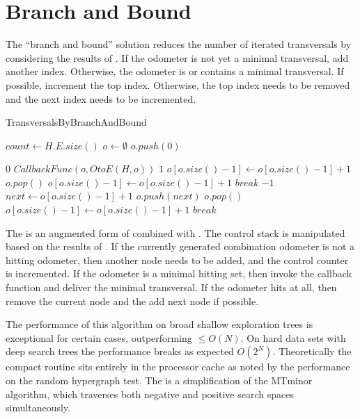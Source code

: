 \chapter{Branch and Bound}

The ``branch and bound'' solution reduces the number of iterated transversals by considering the results of . If the odometer is not yet a minimal transversal, add another index. Otherwise, the odometer is or contains a minimal transversal. If possible,  increment the top index. Otherwise, the top index needs to be removed and the next index needs to be incremented.

\begin{algorithm}[H]
    \centering
	\caption{TransversalsByBranchAndBound}\label{TransversalsByBranchAndBound}
	\begin{algorithmic}[1]
		\State $count \gets H.E.size()$
		\State $o \gets \emptyset$
		\State $o.push(0)$
		 {}
		
		\Case $0$
		\State $CallbackFunc(o,OtoE(H,o))$  
		\EndCase
		\Case $1$
		\State $o[o.size()-1] \gets o[o.size()-1] +1$
		\Else
		\State $o.pop()$
		\State $o[o.size()-1] \gets o[o.size()-1] +1 $
		\EndIf
		\EndIf
		\State $break$
		\EndCase
		\Case $-1$
		\State $next \gets o[o.size()-1] + 1$
		\State $o.push(next)$
		\Else
		\State $o.pop()$
		\State $o[o.size()-1] \gets o[o.size()-1] +1 $
		\EndIf
		\EndIf
		\State $break$
		\EndCase
		\EndSwitch
		
		\EndWhile
		\EndFunction
	\end{algorithmic}
\end{algorithm}

The  is an augmented form of  combined with . The control stack is manipulated based on the results of . If the currently generated combination odometer is not a hitting odometer, then another node needs to be added, and the control counter is incremented. 
If the odometer is a minimal hitting set, then invoke the callback function and deliver the minimal transversal. If the odometer hits at all, then remove the current node and the add next node if possible. 

The performance of this algorithm on broad shallow exploration trees is exceptional for certain cases, outperforming $ \le O(N)$. On hard data sets with deep search trees the performance breaks as expected $O(2^N)$. Theoretically the compact routine sits entirely in the processor cache as noted by the performance on the random hypergraph test. The  is a simplification of the MTminor algorithm, which traverses both negative and positive search spaces simultaneously. ~\cite{hebert2007data} ~\cite{dong2005mining}